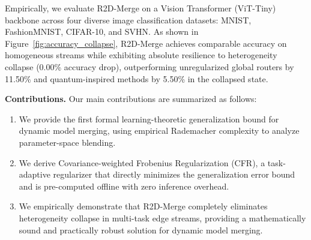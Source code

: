 Empirically, we evaluate R2D-Merge on a Vision Transformer (ViT-Tiny) backbone across four diverse image classification datasets: MNIST, FashionMNIST, CIFAR-10, and SVHN. As shown in Figure~\ref{fig:accuracy_collapse}, R2D-Merge achieves comparable accuracy on homogeneous streams while exhibiting absolute resilience to heterogeneity collapse (0.00\% accuracy drop), outperforming unregularized global routers by 11.50\% and quantum-inspired methods by 5.50\% in the collapsed state.

\textbf{Contributions.} Our main contributions are summarized as follows:
\begin{enumerate}
    \item We provide the first formal learning-theoretic generalization bound for dynamic model merging, using empirical Rademacher complexity to analyze parameter-space blending.
    \item We derive Covariance-weighted Frobenius Regularization (CFR), a task-adaptive regularizer that directly minimizes the generalization error bound and is pre-computed offline with zero inference overhead.
    \item We empirically demonstrate that R2D-Merge completely eliminates heterogeneity collapse in multi-task edge streams, providing a mathematically sound and practically robust solution for dynamic model merging.
\end{enumerate}
